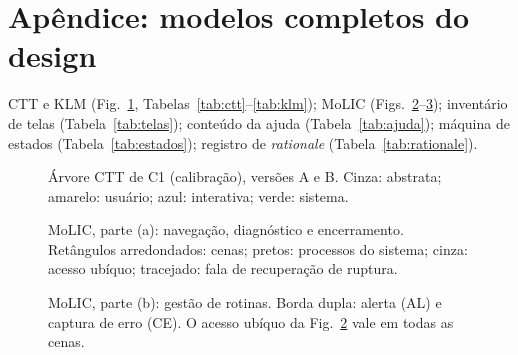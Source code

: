 \documentclass[conference]{IEEEtran}
\begin{document}
\section*{Apêndice: modelos completos do design}
CTT e KLM (Fig.~\ref{fig:ctt-c1}, Tabelas~\ref{tab:ctt}--\ref{tab:klm}); MoLIC (Figs.~\ref{fig:molic-a}--\ref{fig:molic-b}); inventário de telas (Tabela~\ref{tab:telas}); conteúdo da ajuda (Tabela~\ref{tab:ajuda}); máquina de estados (Tabela~\ref{tab:estados}); registro de \textit{rationale} (Tabela~\ref{tab:rationale}).


\begin{figure}[!h]
\centering
\resizebox{!}{0.40\textheight}{}
\caption{Árvore CTT de C1 (calibração), versões A e B. Cinza: abstrata; amarelo: usuário; azul: interativa; verde: sistema.}
\label{fig:ctt-c1}
\end{figure}
\begin{table}[!tp]
\caption{CTT de C2, V1 e V2 em notação textual (V1 e V2 reescrevem a HTA congelada sem alterá-la)}
\label{tab:ctt}
\centering

\end{table}
\begin{table}[!tp]
\caption{Linha de base KLM de especialista (caminho mínimo, sem erros). Tempo $= 1{,}35\,n_M + 1{,}38\,A_{\min}$}
\label{tab:klm}
\centering

\end{table}


\begin{figure}
\centering

\caption{MoLIC, parte (a): navegação, diagnóstico e encerramento. Retângulos arredondados: cenas; pretos: processos do sistema; cinza: acesso ubíquo; tracejado: fala de recuperação de ruptura.}
\label{fig:molic-a}
\end{figure}

\begin{figure}[!tp]
\centering
\resizebox{0.72\textwidth}{!}{}
\caption{MoLIC, parte (b): gestão de rotinas. Borda dupla: alerta (AL) e captura de erro (CE). O acesso ubíquo da Fig.~\ref{fig:molic-a} vale em todas as cenas.}
\label{fig:molic-b}
\end{figure}


\begin{table}[!tp]
\caption{Inventário de telas (ordem visual = ordem em $o_t$; [B]: só na versão B)}
\label{tab:telas}
\centering

\end{table}


\begin{table}[!tp]
\caption{Tópicos da Ajuda (S6) por tipo de dúvida; texto igual ao exibido}
\label{tab:ajuda}
\centering

\end{table}
\end{document}

